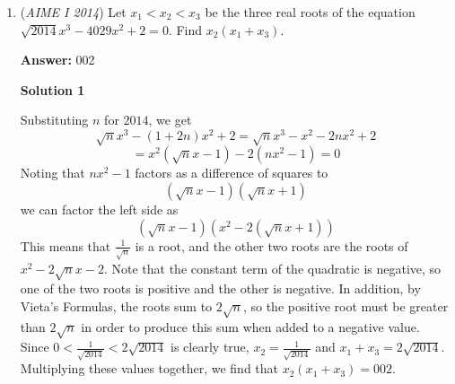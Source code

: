 \begin{enumerate}
 



\textbf{Solution 6 (Exact same as 3 but with less fancy words)}

The problem statement is equivalent to $N^2 \equiv N\pmod{10000}$, and subtracting $N$ from both sides and factoring yields $N(N-1) \equiv 0\pmod{10000}$. By the Chinese Remainder Theorem, the equation $N(N-1)\equiv 0\pmod{10000}$ is equivalent to the two equations:
 \begin{align*} N(N-1)&\equiv 0\pmod{16},\\ N(N-1)&\equiv 0\pmod{625}. \end{align*}


 So, 
 \begin{align*} N&\equiv 0, 1\pmod{16},\\ N&\equiv 0, 1\pmod{625}. \end{align*}


 If $N\equiv 0\pmod{16}$ and $N\equiv 0\pmod{625}$, then $N\equiv 0\pmod{10000}$, but this contradicts $a \neq 0$.

 If $N\equiv 1\pmod{16}$ and $N\equiv 1\pmod{625}$, then $N\equiv 1\pmod{10000}$, but this contradicts $a \neq 0$.

 
If $N\equiv 1\pmod{16}$ and $N\equiv 0\pmod{625}$, then $N\equiv 625\pmod{10000}$, but this contradicts $a \neq 0$.

 If $N\equiv 0\pmod{16}$ and $N\equiv 1\pmod{625}$, then $N\equiv 9376\pmod{10000}$. We can square this to check: $9376^2=87909376$. Our answer is $\boxed{937}$.

 Note: the problem where this is linked is covered 0:20-1:50

 


	\item (\textit{AIME I 2014}) Let $x_1< x_2 < x_3$ be the three real roots of the equation $\sqrt{2014} x^3 - 4029x^2 + 2 = 0$. Find $x_2(x_1+x_3)$.


 
 \textbf{Answer: }002



\textbf{Solution 1}

Substituting $n$ for $2014$, we get 
 \[\sqrt{n}x^3 - (1+2n)x^2 + 2 = \sqrt{n}x^3 - x^2 - 2nx^2 + 2\] 
 \[= x^2(\sqrt{n}x - 1) - 2(nx^2 - 1) = 0\] Noting that $nx^2 - 1$ factors as a difference of squares to 
 \[(\sqrt{n}x - 1)(\sqrt{n}x+1)\] we can factor the left side as 
 \[(\sqrt{n}x - 1)(x^2 - 2(\sqrt{n}x+1))\] This means that $\frac{1}{\sqrt{n}}$ is a root, and the other two roots are the roots of $x^2 - 2\sqrt{n}x - 2$. Note that the constant term of the quadratic is negative, so one of the two roots is positive and the other is negative. In addition, by Vieta's Formulas, the roots sum to $2\sqrt{n}$, so the positive root must be greater than $2\sqrt{n}$ in order to produce this sum when added to a negative value. Since $0 < \frac{1}{\sqrt{2014}} < 2\sqrt{2014}$ is clearly true, $x_2 = \frac{1}{\sqrt{2014}}$ and $x_1 + x_3 = 2\sqrt{2014}$. Multiplying these values together, we find that $x_2(x_1+x_3) = \boxed{002}$.


\end{enumerate}
